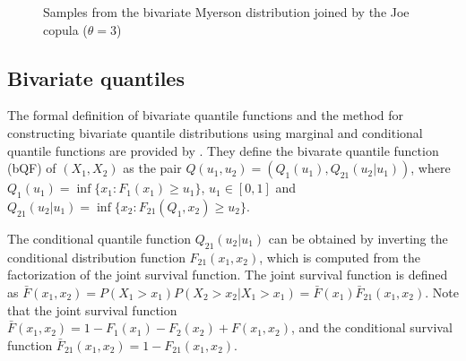 \documentclass[
  fleqn,
  deca,
  blindrev
]{informs4}
\begin{document}
\begin{figure}


\caption{\label{fig-bc-myerson}Samples from the bivariate Myerson
distribution joined by the Joe copula (\(\theta=3\))}

\end{figure}%

\subsection{Bivariate quantiles}\label{bivariate-quantiles}

The formal definition of bivariate quantile functions and the method for
constructing bivariate quantile distributions using marginal and
conditional quantile functions are provided by
\citep{nair2023PropertiesBivariateDistributions, vineshkumar2019BivariateQuantileFunctions}.
They define the bivarate quantile function (bQF) of \((X_1, X_2)\) as
the pair \(Q(u_1, u_2)=(Q_1(u_1), Q_{21}(u_2\vert u_1))\), where
\(Q_1(u_1)=\inf \{x_1: F_1(x_1)\geq u_1\}\), \(u_1\in[0,1]\) and
\(Q_{21}(u_2\vert u_1)=\inf\{x_2: F_{21}(Q_1, x_2)\geq u_2\}\).

The conditional quantile function \(Q_{21}(u_2\vert u_1)\) can be
obtained by inverting the conditional distribution function
\(F_{21}(x_1, x_2)\), which is computed from the factorization of the
joint survival function. The joint survival function is defined as
\(\bar{F}(x_1, x_2)=P(X_1> x_1)P(X_2> x_2 \vert X_1 > x_1)= \bar{F}(x_1)\bar{F}_{21}(x_1,x_2)\).
Note that the joint survival function
\(\bar{F}(x_1,x_2)=1-F_1(x_1)-F_2(x_2)+F(x_1,x_2)\), and the conditional
survival function \(\bar{F}_{21}(x_1,x_2)=1-F_{21}(x_1,x_2)\).
\end{document}
